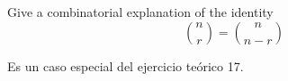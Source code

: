\item Give a combinatorial explanation of the identity
\[ \binom{n}{r} = \binom{n}{n-r} \]

Es un caso especial del ejercicio teórico 17.